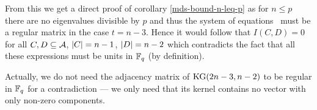 From this we get a direct proof of corollary \autoref{mds-bound-n-leq-p} as for $n\leq p$ there are no eigenvalues divisible by $p$ and thus the system of equations~
must be a regular matrix in the case $t=n-3$. Hence it would follow that $I(C,D)=0$ for all $C,D\subseteq \mathcal{A}$, $\left\vert{C}\right\vert=n-1$, $\left\vert{D}\right\vert=n-2$ which contradicts the fact that all these expressions must be units in $\mathbb{F}_{q}$ (by definition).

\begin{remark}
    Actually, we do not need the adjacency matrix of $\mathop\mathrm{KG}(2n-3,n-2)$ to be regular in $\mathbb{F}_{q}$ for a contradiction --- we only need that its kernel contains no vector with only non-zero components.
\end{remark}




